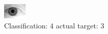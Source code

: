 \begin{figure}[h!]
\begin{center}
\includegraphics[width=0.60\columnwidth]{figures/ID2190_class_4_target_3.png}
\end{center}
\caption{ Classification: 4 actual target: 3}
\label{fig:ID2190_class_4_target_3}
\end{figure}
